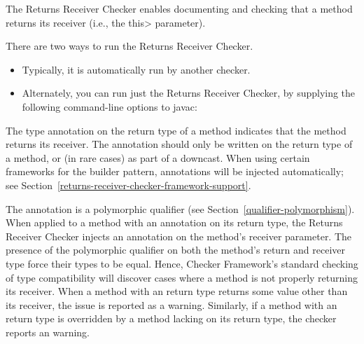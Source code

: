 \htmlhr
{}

The Returns Receiver Checker enables documenting and checking that a method
returns its receiver (i.e., the \<this> parameter).

There are two ways to run the Returns Receiver Checker.
\begin{itemize}
\item
Typically, it is automatically run by another checker.
\item
Alternately, you can run just the Returns Receiver Checker, by
supplying the following command-line options to javac:
\end{itemize}



The type annotation
 on the return type of a method
indicates that the method returns its receiver.  The
 annotation should only be written
on the return type of a method, or (in rare cases) as part of a downcast.  When
using certain frameworks for the builder pattern,
 annotations will be injected
automatically; see Section~\ref{returns-receiver-checker-framework-support}.



The  annotation is a polymorphic
qualifier (see Section~\ref{qualifier-polymorphism}).  When applied to a method
with an  annotation on its return
type, the Returns Receiver Checker injects an
 annotation on the method's receiver
parameter.  The presence of the polymorphic
 qualifier on both the method's
return and receiver type force their types to be equal.  Hence, Checker
Framework's standard checking of type compatibility will discover cases where a
method is not properly returning its receiver.  When a method with an
 return type returns some value
other than its receiver, the issue is reported as a
 warning.  Similarly, if a method with an
 return type is overridden by a
method lacking  on its return type,
the checker reports an  warning.

